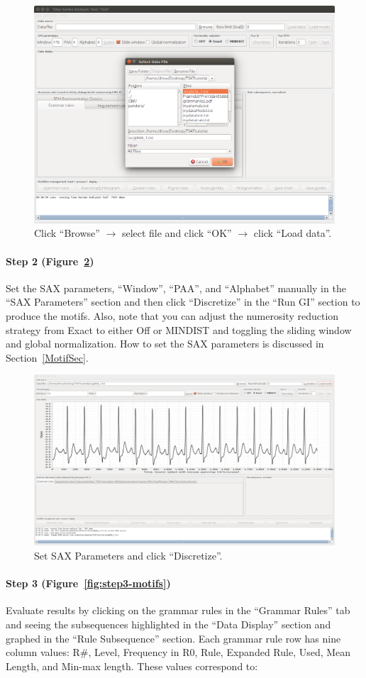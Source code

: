 \documentclass[titlepage, letterpaper, 12pt]{article}
\begin{document}
\begin{figure}[H]
	\centering
	\includegraphics[width=0.7\linewidth]{pictures/motifguide/step1-browse}
	\caption{Click ``Browse'' $\rightarrow$ select file and click ``OK'' $\rightarrow$ click ``Load data''.}
	\label{fig:step1-browse}
\end{figure}


\paragraph{Step 2 (Figure~\ref{fig:step2-loaded})} Set the SAX parameters, ``Window'', ``PAA'', and ``Alphabet'' manually in the ``SAX Parameters'' section and then click ``Discretize'' in the ``Run GI'' section to produce the motifs.  Also, note that you can adjust the numerosity reduction strategy from Exact to either Off or MINDIST and toggling the sliding window and global normalization. How to set the SAX parameters is discussed in Section~\ref{MotifSec}.

\begin{figure}[H]
	\centering
	\includegraphics[width=0.7\linewidth]{pictures/motifguide/Step2-loaded}
	\caption{Set SAX Parameters and click ``Discretize''.}
	\label{fig:step2-loaded}
\end{figure}


\paragraph{Step 3 (Figure~\ref{fig:step3-motifs})} Evaluate results by clicking on the grammar rules in the ``Grammar Rules'' tab and seeing the subsequences highlighted in the ``Data Display'' section and graphed in the ``Rule Subsequence'' section.  Each grammar rule row has nine column values: R\#, Level, Frequency in R0, Rule, Expanded Rule, Used, Mean Length, and Min-max length.  These values correspond to:
\end{document}
